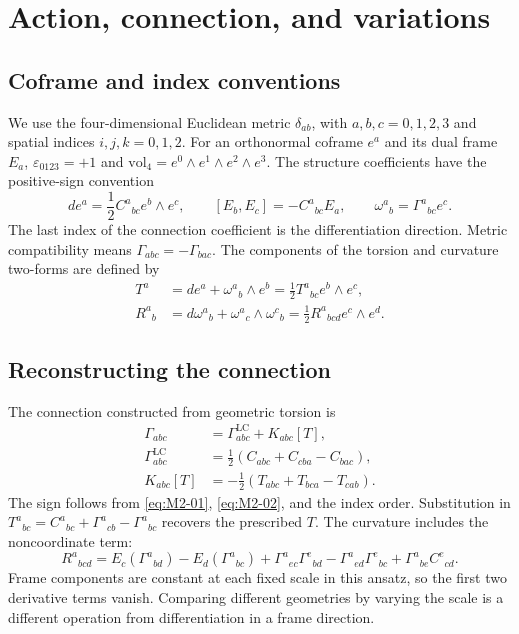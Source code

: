\section{Action, connection, and variations}\label{sec2}
\subsection{Coframe and index conventions}
We use the four-dimensional Euclidean metric $\delta_{ab}$, with
$a,b,c=0,1,2,3$ and spatial indices $i,j,k=0,1,2$.
For an orthonormal coframe $e^a$ and its dual frame $E_a$,
$\varepsilon_{0123}=+1$ and
$\mathrm{vol}_4=e^0\wedge e^1\wedge e^2\wedge e^3$.
The structure coefficients have the positive-sign convention
\begin{equation}
de^a=\frac12 C^a{}_{bc}e^b\wedge e^c,\qquad
[E_b,E_c]=-C^a{}_{bc}E_a,\qquad
\omega^a{}_b=\Gamma^a{}_{bc}e^c.
\tag{M2-01}\label{eq:M2-01}
\end{equation}
The last index of the connection coefficient is the differentiation
direction. Metric compatibility means $\Gamma_{abc}=-\Gamma_{bac}$.
The components of the torsion and curvature two-forms are defined by
\begin{equation}
\begin{aligned}
T^a&=de^a+\omega^a{}_b\wedge e^b
     =\frac12 T^a{}_{bc}e^b\wedge e^c,\\
R^a{}_b&=d\omega^a{}_b+\omega^a{}_c\wedge\omega^c{}_b
     =\frac12 R^a{}_{bcd}e^c\wedge e^d.
\end{aligned}
\tag{M2-02}\label{eq:M2-02}
\end{equation}

\subsection{Reconstructing the connection}
The connection constructed from geometric torsion is
\begin{equation}
\begin{aligned}
\Gamma_{abc}&=\Gamma^{\mathrm{LC}}_{abc}+K_{abc}[T],\\
\Gamma^{\mathrm{LC}}_{abc}
 &=\frac12(C_{abc}+C_{cba}-C_{bac}),\\
K_{abc}[T]&=-\frac12(T_{abc}+T_{bca}-T_{cab}).
\end{aligned}
\tag{M2-03}\label{eq:M2-03}
\end{equation}
The sign follows from \eqref{eq:M2-01}, \eqref{eq:M2-02}, and the index
order. Substitution in
$T^a{}_{bc}=C^a{}_{bc}+\Gamma^a{}_{cb}-\Gamma^a{}_{bc}$
recovers the prescribed $T$. The curvature includes the noncoordinate term:
\begin{equation}
R^a{}_{bcd}
=E_c(\Gamma^a{}_{bd})-E_d(\Gamma^a{}_{bc})
+\Gamma^a{}_{ec}\Gamma^e{}_{bd}
-\Gamma^a{}_{ed}\Gamma^e{}_{bc}
+\Gamma^a{}_{be}C^e{}_{cd}.
\tag{M2-04}\label{eq:M2-04}
\end{equation}
Frame components are constant at each fixed scale in this ansatz, so
the first two derivative terms vanish. Comparing different geometries
by varying the scale is a different operation from differentiation
in a frame direction.

